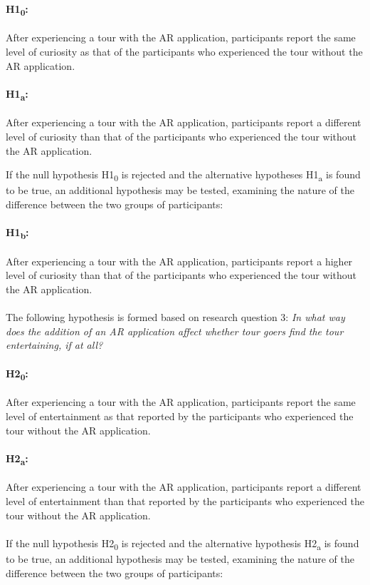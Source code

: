 \paragraph{H1\textsubscript{0}:} After experiencing a tour with the AR application, participants report the same level of curiosity as that of the participants who experienced the tour without the AR application.

\paragraph{H1\textsubscript{a}:}  After experiencing a tour with the AR application, participants report a different level of curiosity than that of the participants who experienced the tour without the AR application.\pagebreak

If the null hypothesis H1\textsubscript{0} is rejected and the alternative hypotheses H1\textsubscript{a} is found to be true, an additional hypothesis may be tested, examining the nature of the difference between the two groups of participants:

\paragraph{H1\textsubscript{b}:} After experiencing a tour with the AR application, participants report a higher level of curiosity than that of the participants who experienced the tour without the AR application.\\
\\
The following hypothesis is formed based on research question 3: \textit{In what way does the addition of an AR application affect whether tour goers find the tour entertaining, if at all?}

\paragraph{H2\textsubscript{0}:} After experiencing a tour with the AR application, participants report the same level of entertainment as that reported by the participants who experienced the tour without the AR application.

\paragraph{H2\textsubscript{a}:} After experiencing a tour with the AR application, participants report a different level of entertainment than that reported by the participants who experienced the tour without the AR application.\\
\\
If the null hypothesis H2\textsubscript{0} is rejected and the alternative hypothesis H2\textsubscript{a} is found to be true, an additional hypothesis may be tested, examining the nature of the difference between the two groups of participants:

